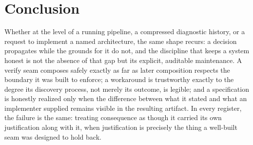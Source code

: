 \section{Conclusion}

Whether at the level of a running pipeline, a compressed diagnostic history, or a request to implement a named architecture, the same shape recurs: a decision propagates while the grounds for it do not, and the discipline that keeps a system honest is not the absence of that gap but its explicit, auditable maintenance. A verify seam composes safely exactly as far as later composition respects the boundary it was built to enforce; a workaround is trustworthy exactly to the degree its discovery process, not merely its outcome, is legible; and a specification is honestly realized only when the difference between what it stated and what an implementer supplied remains visible in the resulting artifact. In every register, the failure is the same: treating consequence as though it carried its own justification along with it, when justification is precisely the thing a well-built seam was designed to hold back.

